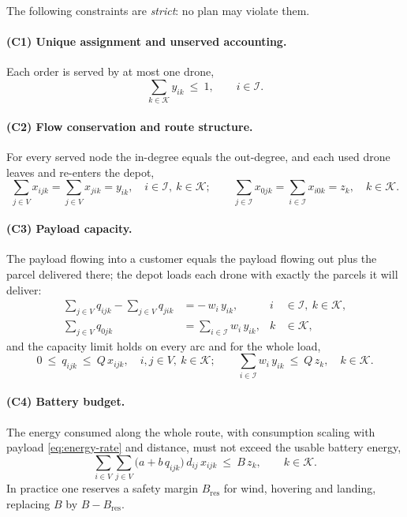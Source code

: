 \documentclass[11pt,a4paper]{article}
\begin{document}
The following constraints are \emph{strict}: no plan may violate them.

\paragraph{(C1) Unique assignment and unserved accounting.}
Each order is served by at most one drone,
\begin{equation}
  \sum_{k\in\mathcal{K}} y_{ik} \ \le \ 1,
  \qquad i \in \mathcal{I}.
  \label{eq:ddrp-assign}
\end{equation}

\paragraph{(C2) Flow conservation and route structure.}
For every served node the in-degree equals the out-degree, and each used drone
leaves and re-enters the depot,
\begin{equation}
  \sum_{j\in V} x_{ijk} = \sum_{j\in V} x_{jik} = y_{ik},
  \quad i\in\mathcal{I},\ k\in\mathcal{K};
  \qquad
  \sum_{j\in\mathcal{I}} x_{0jk} = \sum_{i\in\mathcal{I}} x_{i0k} = z_{k},
  \quad k\in\mathcal{K}.
  \label{eq:ddrp-flow}
\end{equation}

\paragraph{(C3) Payload capacity.}
The payload flowing into a customer equals the payload flowing out plus the
parcel delivered there; the depot loads each drone with exactly the parcels it
will deliver:
\begin{align}
  \sum_{j\in V} q_{ijk} - \sum_{j\in V} q_{jik} &= -\,w_{i}\,y_{ik},
    & i &\in \mathcal{I},\ k\in\mathcal{K},
    \label{eq:ddrp-load-balance}\\
  \sum_{j\in V} q_{0jk} &= \sum_{i\in\mathcal{I}} w_{i}\,y_{ik},
    & k &\in\mathcal{K},
    \label{eq:ddrp-depot-load}
\end{align}
and the capacity limit holds on every arc and for the whole load,
\begin{equation}
  0 \ \le \ q_{ijk} \ \le \ Q\,x_{ijk},
  \quad i,j\in V,\ k\in\mathcal{K};
  \qquad
  \sum_{i\in\mathcal{I}} w_{i}\,y_{ik} \ \le \ Q\,z_{k},
  \quad k\in\mathcal{K}.
  \label{eq:ddrp-capacity}
\end{equation}

\paragraph{(C4) Battery budget.}
The energy consumed along the whole route, with consumption scaling with
payload \eqref{eq:energy-rate} and distance, must not exceed the usable battery
energy,
\begin{equation}
  \sum_{i\in V}\sum_{j\in V} \bigl(a + b\,q_{ijk}\bigr)\, d_{ij}\, x_{ijk}
  \ \le \ B\, z_{k},
  \qquad k\in\mathcal{K}.
  \label{eq:ddrp-battery}
\end{equation}
In practice one reserves a safety margin $B_{\text{res}}$ for wind, hovering and
landing, replacing $B$ by $B-B_{\text{res}}$.
\end{document}
